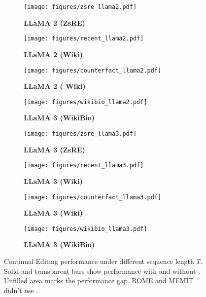 \begin{figure*}[htb!]
    \captionsetup[subfigure]{font=footnotesize,labelformat=parens,labelfont=footnotesize}
    \def\subfigwidth{0.24\linewidth}
    \centering
    \begin{subfigure}[t]{\subfigwidth}
        \texttt{[image: figures/zsre\_llama2.pdf]}
        \caption{\footnotesize  \bf  LLaMA 2 (ZsRE)}
        \label{fig:subfig-a}
    \end{subfigure}%
    \hfill%
    \begin{subfigure}[t]{\subfigwidth}
        \texttt{[image: figures/recent\_llama2.pdf]}
        \caption{\footnotesize  \bf  LLaMA 2 (Wiki)}
        \label{fig:subfig-b}
    \end{subfigure}%
    \hfill%
    \begin{subfigure}[t]{\subfigwidth}
        \texttt{[image: figures/counterfact\_llama2.pdf]}
        \caption{\footnotesize  \bf LLaMA 2 ( Wiki)}
        \label{fig:subfig-c}
    \end{subfigure}
    \hfill%
    \begin{subfigure}[t]{\subfigwidth}
        \texttt{[image: figures/wikibio\_llama2.pdf]}
        \caption{\footnotesize  \bf LLaMA 3 (WikiBio)}
        \label{fig:subfig-d}
    \end{subfigure}

    \vspace{1em}

    \begin{subfigure}[t]{\subfigwidth}
        \texttt{[image: figures/zsre\_llama3.pdf]}
        \caption{\footnotesize  \bf LLaMA 3 (ZsRE)}
        \label{fig:subfig-a2}
    \end{subfigure}%
    \hfill%
    \begin{subfigure}[t]{\subfigwidth}
        \texttt{[image: figures/recent\_llama3.pdf]}
        \caption{\footnotesize \bf LLaMA 3 (Wiki)}
        \label{fig:subfig-b2}
    \end{subfigure}%
    \hfill%
    \begin{subfigure}[t]{\subfigwidth}
        \texttt{[image: figures/counterfact\_llama3.pdf]}
        \caption{\footnotesize \bf  LLaMA 3 (Wiki)}
        \label{fig:subfig-c2}
    \end{subfigure}
    \hfill%
    \begin{subfigure}[t]{\subfigwidth}
        \texttt{[image: figures/wikibio\_llama3.pdf]}
        \caption{\footnotesize \bf LLaMA 3 (WikiBio)}
        \label{fig:subfig-d2}
    \end{subfigure}

    \caption{
    Continual Editing performance under different sequence length $T$. 
    Solid and transparent bars show performance with and without {\NAME}. 
    Unfilled area marks the performance gap. 
    ROME and MEMIT didn't use {\NAME}. 
    }
    \label{fig:continual}
\vspace{-0.2cm}
\end{figure*}
